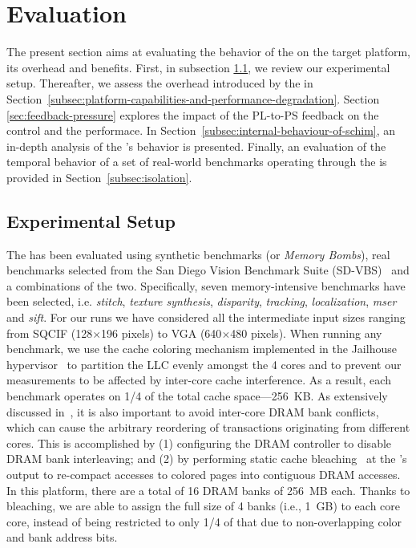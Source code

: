 \section{Evaluation}

The present section aims at evaluating the behavior of the \schim on
the target platform, its overhead and benefits.  First, in subsection
\ref{subsection:considered-architecture}, we review our experimental
setup. Thereafter, we assess the overhead introduced by the \schim in
Section~\ref{subsec:platform-capabilities-and-performance-degradation}.
Section \ref{sec:feedback-pressure} explores the impact of the PL-to-PS feedback
on the control and the performace.
In Section~\ref{subsec:internal-behaviour-of-schim}, an in-depth analysis
of the \schim's behavior is presented. Finally, an evaluation of the
temporal behavior of a set of real-world benchmarks operating through
the \schim is provided in Section~\ref{subsec:isolation}.


\subsection{Experimental Setup}
\label{subsection:considered-architecture}
The \schim has been evaluated using synthetic benchmarks (or
\emph{Memory Bombs}), real benchmarks selected from the San Diego
Vision Benchmark Suite (SD-VBS)~\cite{SD-VBS} and a combinations of
the two. Specifically, seven memory-intensive benchmarks have
been selected, i.e. \emph{stitch}, \emph{texture synthesis},
\emph{disparity}, \emph{tracking}, \emph{localization}, \emph{mser}
and \emph{sift}. For our runs we have considered all the intermediate
input sizes ranging from SQCIF (128$\times$196 pixels) to VGA
(640$\times$480 pixels). When running any benchmark, we use the cache
coloring mechanism implemented in the Jailhouse
hypervisor~\cite{determ_virt} to partition the LLC evenly amongst the
4 cores and to prevent our measurements to be affected by inter-core
cache interference. As a result, each benchmark operates on 1/4 of the
total cache space---256~KB. As extensively discussed
in~\cite{bounding_rtas14, palloc_rtas14}, it is also important to
avoid inter-core DRAM bank conflicts, which can cause the arbitrary
reordering of transactions originating from different cores. This is
accomplished by (1) configuring the DRAM controller to disable DRAM
bank interleaving; and (2) by performing static cache
bleaching~\cite{gracioli2019designing, PLIM20} at the \schim's output
to re-compact accesses to colored pages into contiguous DRAM
accesses. In this platform, there are a total of 16 DRAM banks of
256~MB each. Thanks to bleaching, we are able to assign the full size
of 4 banks (i.e., 1~GB) to each core core, instead of being restricted
to only 1/4 of that due to non-overlapping color and bank address
bits.

